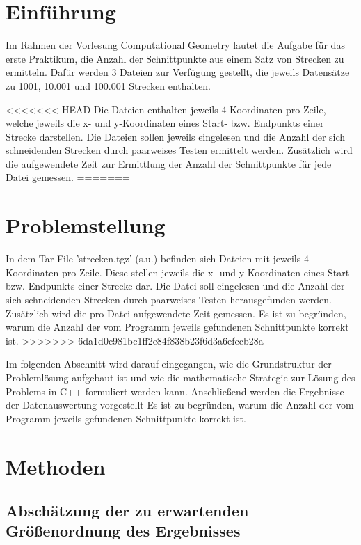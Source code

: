 \documentclass[12pt]{scrartcl}
\begin{document}
\section{Einführung}
Im Rahmen der Vorlesung Computational Geometry lautet die Aufgabe für das erste Praktikum, die Anzahl der Schnittpunkte aus einem Satz von Strecken zu ermitteln.
Dafür werden 3 Dateien zur Verfügung gestellt, die jeweils Datensätze zu 1001, 10.001 und 100.001 Strecken enthalten.

<<<<<<< HEAD
Die Dateien enthalten jeweils 4 Koordinaten pro Zeile, welche jeweils die x- und y-Koordinaten eines Start- bzw. Endpunkts einer Strecke darstellen.
Die Dateien sollen jeweils eingelesen und die Anzahl der sich schneidenden Strecken durch paarweises Testen ermittelt werden.
Zusätzlich wird die aufgewendete Zeit zur Ermittlung der Anzahl der Schnittpunkte für jede Datei gemessen.
=======
\section{Problemstellung}
In dem Tar-File 'strecken.tgz' (s.u.) befinden sich Dateien mit jeweils 4 Koordinaten pro Zeile.
Diese stellen jeweils die x- und y-Koordinaten eines Start- bzw. Endpunkts einer Strecke dar.
Die Datei soll eingelesen und die Anzahl der sich schneidenden Strecken durch paarweises Testen herausgefunden werden.
Zusätzlich wird die pro Datei aufgewendete Zeit gemessen.
Es ist zu begründen, warum die Anzahl der vom Programm jeweils gefundenen Schnittpunkte korrekt ist.
>>>>>>> 6da1d0c981bc1ff2e84f838b23f6d3a6efccb28a

Im folgenden Abschnitt wird darauf eingegangen, wie die Grundstruktur der Problemlösung aufgebaut ist und wie die mathematische Strategie zur Lösung des Problems in C++ formuliert werden kann.
Anschließend werden die Ergebnisse der Datenauswertung vorgestellt
Es ist zu begründen, warum die Anzahl der vom Programm jeweils gefundenen Schnittpunkte korrekt ist.

\section{Methoden}

\subsection{Abschätzung der zu erwartenden Größenordnung des Ergebnisses}
\end{document}

